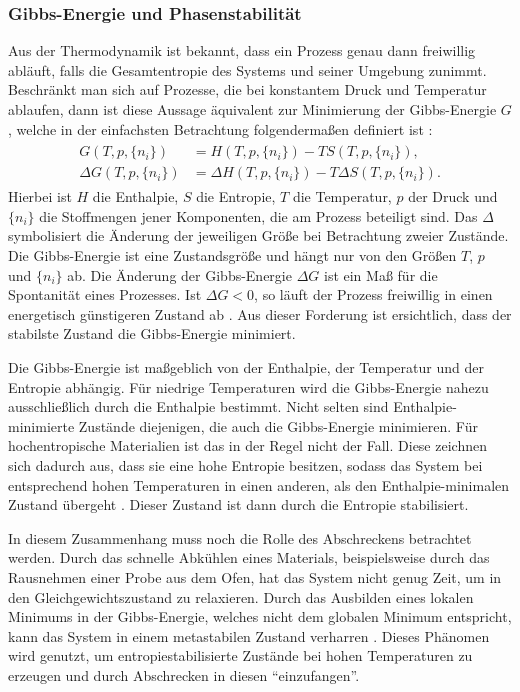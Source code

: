 \subsubsection{Gibbs-Energie und Phasenstabilität}
Aus der Thermodynamik ist bekannt, dass ein Prozess genau dann freiwillig abläuft, falls die Gesamtentropie des
Systems und seiner Umgebung zunimmt.
Beschränkt man sich auf Prozesse, die bei konstantem Druck und Temperatur ablaufen, dann ist diese Aussage äquivalent
zur Minimierung der Gibbs-Energie $G$, welche in der einfachsten Betrachtung folgendermaßen definiert ist
\autocite{Demtrder2015}:
\begin{align}
    \begin{split}
        G(T,p, \{ n_{i} \})&=H(T,p,\{ n_{i} \})-TS(T,p,\{ n_{i} \}), \\
        \Delta G(T, p, \{ n_{i} \})&=\Delta H(T,p, \{ n_{i} \})-T \Delta S(T,p, \{ n_{i} \}).
    \end{split}
    \label{eq:gibbs}
\end{align}
Hierbei ist $H$ die Enthalpie, $S$ die Entropie, $T$ die Temperatur, $p$ der Druck und $\{n_{i}\}$ die Stoffmengen jener
Komponenten, die am Prozess beteiligt sind.
Das $\Delta$ symbolisiert die Änderung der jeweiligen Größe bei Betrachtung zweier Zustände.
Die Gibbs-Energie ist eine Zustandsgröße und hängt nur von den Größen $T$, $p$ und $\{ n_{i} \}$ ab.
Die Änderung der Gibbs-Energie $\Delta G$ ist ein Maß für die Spontanität eines Prozesses.
Ist $\Delta G < 0$, so läuft der Prozess freiwillig in einen energetisch günstigeren Zustand ab \autocite{rost_phd}.
Aus dieser Forderung ist ersichtlich, dass der stabilste Zustand die Gibbs-Energie minimiert.

Die Gibbs-Energie ist maßgeblich von der Enthalpie, der Temperatur und der Entropie abhängig.
Für niedrige Temperaturen wird die Gibbs-Energie nahezu ausschließlich durch die Enthalpie bestimmt.
Nicht selten sind Enthalpie-minimierte Zustände diejenigen, die auch die Gibbs-Energie minimieren.
Für hochentropische Materialien ist das in der Regel nicht der Fall.
Diese zeichnen sich dadurch aus, dass sie eine hohe Entropie besitzen, sodass das System
bei entsprechend hohen Temperaturen in einen anderen, als den Enthalpie-minimalen Zustand übergeht \autocite{Rost2015}.
Dieser Zustand ist dann durch die Entropie stabilisiert.

In diesem Zusammenhang muss noch die Rolle des Abschreckens betrachtet werden.
Durch das schnelle Abkühlen eines Materials, beispielsweise durch das Rausnehmen einer Probe aus dem Ofen,
hat das System nicht genug Zeit, um in den Gleichgewichtszustand zu relaxieren.
Durch das Ausbilden eines lokalen Minimums in der Gibbs-Energie, welches nicht dem globalen Minimum entspricht,
kann das System in einem metastabilen Zustand verharren \autocite{rost_phd}.
Dieses Phänomen wird genutzt, um entropiestabilisierte Zustände bei hohen Temperaturen zu erzeugen
und durch Abschrecken in diesen ``einzufangen''.


